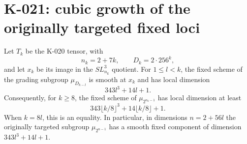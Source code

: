 \section{K-021: cubic growth of the originally targeted fixed loci}

\begin{theorem}[K-021]
Let $T_k$ be the K-020 tensor, with
\[
 n_k=2+7k,\qquad D_k=2\cdot256^k,
\]
and let $x_k$ be its image in the $SL_{n_k}^3$ quotient.
For $1\le l<k$, the fixed scheme of the grading subgroup
$\mu_{D_{k-l}}$ is smooth at $x_k$ and has local dimension
\[
                         343l^3+14l+1.                 \tag{K-021a}
\]
Consequently, for $k\ge8$, the fixed scheme of
$\mu_{2^{n_k-1}}$ has local dimension at least
\[
          343\lfloor k/8\rfloor^3+14\lfloor k/8\rfloor+1.
                                                               \tag{K-021b}
\]
When $k=8l$, this is an equality.  In particular, in dimensions
$n=2+56l$ the originally targeted subgroup $\mu_{2^{n-1}}$
has a smooth fixed component of dimension $343l^3+14l+1$.
\end{theorem}

